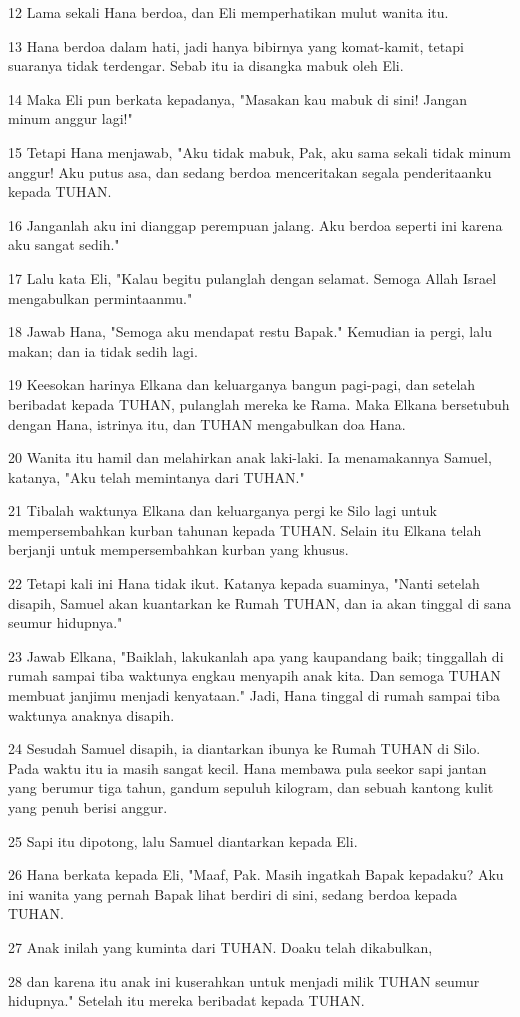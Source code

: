 \par 12 Lama sekali Hana berdoa, dan Eli memperhatikan mulut wanita itu.
\par 13 Hana berdoa dalam hati, jadi hanya bibirnya yang komat-kamit, tetapi suaranya tidak terdengar. Sebab itu ia disangka mabuk oleh Eli.
\par 14 Maka Eli pun berkata kepadanya, "Masakan kau mabuk di sini! Jangan minum anggur lagi!"
\par 15 Tetapi Hana menjawab, "Aku tidak mabuk, Pak, aku sama sekali tidak minum anggur! Aku putus asa, dan sedang berdoa menceritakan segala penderitaanku kepada TUHAN.
\par 16 Janganlah aku ini dianggap perempuan jalang. Aku berdoa seperti ini karena aku sangat sedih."
\par 17 Lalu kata Eli, "Kalau begitu pulanglah dengan selamat. Semoga Allah Israel mengabulkan permintaanmu."
\par 18 Jawab Hana, "Semoga aku mendapat restu Bapak." Kemudian ia pergi, lalu makan; dan ia tidak sedih lagi.
\par 19 Keesokan harinya Elkana dan keluarganya bangun pagi-pagi, dan setelah beribadat kepada TUHAN, pulanglah mereka ke Rama. Maka Elkana bersetubuh dengan Hana, istrinya itu, dan TUHAN mengabulkan doa Hana.
\par 20 Wanita itu hamil dan melahirkan anak laki-laki. Ia menamakannya Samuel, katanya, "Aku telah memintanya dari TUHAN."
\par 21 Tibalah waktunya Elkana dan keluarganya pergi ke Silo lagi untuk mempersembahkan kurban tahunan kepada TUHAN. Selain itu Elkana telah berjanji untuk mempersembahkan kurban yang khusus.
\par 22 Tetapi kali ini Hana tidak ikut. Katanya kepada suaminya, "Nanti setelah disapih, Samuel akan kuantarkan ke Rumah TUHAN, dan ia akan tinggal di sana seumur hidupnya."
\par 23 Jawab Elkana, "Baiklah, lakukanlah apa yang kaupandang baik; tinggallah di rumah sampai tiba waktunya engkau menyapih anak kita. Dan semoga TUHAN membuat janjimu menjadi kenyataan." Jadi, Hana tinggal di rumah sampai tiba waktunya anaknya disapih.
\par 24 Sesudah Samuel disapih, ia diantarkan ibunya ke Rumah TUHAN di Silo. Pada waktu itu ia masih sangat kecil. Hana membawa pula seekor sapi jantan yang berumur tiga tahun, gandum sepuluh kilogram, dan sebuah kantong kulit yang penuh berisi anggur.
\par 25 Sapi itu dipotong, lalu Samuel diantarkan kepada Eli.
\par 26 Hana berkata kepada Eli, "Maaf, Pak. Masih ingatkah Bapak kepadaku? Aku ini wanita yang pernah Bapak lihat berdiri di sini, sedang berdoa kepada TUHAN.
\par 27 Anak inilah yang kuminta dari TUHAN. Doaku telah dikabulkan,
\par 28 dan karena itu anak ini kuserahkan untuk menjadi milik TUHAN seumur hidupnya." Setelah itu mereka beribadat kepada TUHAN.

